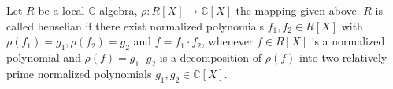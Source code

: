 Let $R$ be a local $\mathbb{C}$-algebra, $\rho: R[X] \rightarrow \mathbb{C}[X]$ the mapping given above. $R$ is called henselian if there exist normalized polynomials $f_1, f_2 \in R[X]$ with $\rho(f_1) = g_1, \rho(f_2) = g_2$ and $f = f_1 \cdot f_2$, whenever $f \in R[X]$ is a normalized polynomial and $\rho(f) = g_1 \cdot g_2$ is a decomposition of $\rho(f)$ into two relatively prime normalized polynomials $g_1, g_2 \in \mathbb{C}[X]$.
